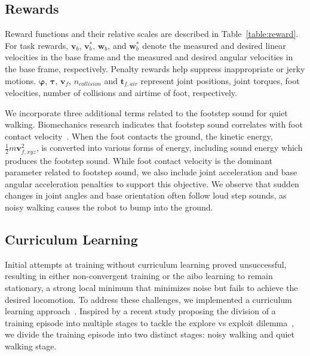 \subsection{Rewards}
Reward functions and their relative scales are described in Table~\ref{table:reward}. 
For task rewards, $\boldsymbol{v}_{b}$, $\boldsymbol{v}_{b}^*$, $\boldsymbol{w}_{b}$, and $\boldsymbol{w}_{b}^*$ denote the measured and desired linear velocities in the base frame and the measured and desired angular velocities in the base frame, respectively.
Penalty rewards help suppress inappropriate or jerky motions. $\boldsymbol{\varphi}$, $\boldsymbol{\tau}$, $\boldsymbol{v}_{f}$, ${n}_{collision}$ and $\boldsymbol{t}_{f,air}$ represent joint positions, joint torques, foot velocities, number of collisions and airtime of foot, respectively.  

We incorporate three additional terms related to the footstep sound for quiet walking. 
Biomechanics research indicates that footstep sound correlates with foot contact velocity~\cite{acoustic_footstep}. When the foot contacts the ground, the kinetic energy, $\frac{1}{2} m \mathbf{v}_{f,xyz}^2$, is converted into various forms of energy, including sound energy which produces the footstep sound. 
While foot contact velocity is the dominant parameter related to footstep sound, we also include joint acceleration and base angular acceleration penalties to support this objective. We observe that sudden changes in joint angles and base orientation often follow loud step sounds, as noisy walking causes the robot to bump into the ground.

\subsection{Curriculum Learning}
Initial attempts at training without curriculum learning proved unsuccessful, resulting in either non-convergent training or the aibo learning to remain stationary, a strong local minimum that minimizes noise but fails to achieve the desired locomotion.
To address these challenges, we implemented a curriculum learning approach~\cite{curriculum1}. Inspired by a recent study proposing the division of a training episode into multiple stages to tackle the explore vs exploit dilemma~\cite{tuyls2022multi, hartmann2024deep}, we divide the training episode into two distinct stages: noisy walking and quiet walking stage. 

